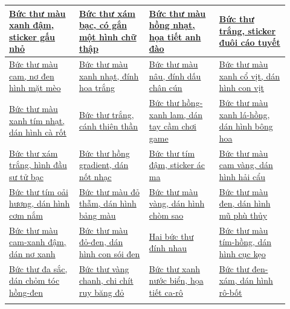 \documentclass[../main.tex]{subfiles}
\begin{document}
\begin{table}[H]
  \label{choice}
  \centering
  \begin{tabular}{|>{\centering\arraybackslash}p{0.23\linewidth}|>{\centering\arraybackslash}p{0.23\linewidth}|>{\centering\arraybackslash}p{0.23\linewidth}|>{\centering\arraybackslash}p{0.23\linewidth}|}\hline
    \hyperref[shino]{Bức thư màu xanh đậm, sticker gấu nhỏ}      & \hyperref[yae]{Bức thư xám bạc, có gắn một hình chữ thập}    & \hyperref[sakura]{Bức thư màu hồng nhạt, họa tiết anh đào}   & \hyperref[inari]{Bức thư trắng, sticker đuôi cáo tuyết}      \\\hline
    \hyperref[hanabi]{Bức thư màu cam, nơ đen hình mặt mèo}      & \hyperref[touka]{Bức thư màu xanh nhạt, đính hoa trắng}      & \hyperref[akane]{Bức thư màu nâu, đính dấu chân cún}         & \hyperref[kaoru]{Bức thư màu xanh cổ vịt, dán hình con vịt}  \\\hline
    \hyperref[uzuki]{Bức thư màu xanh tím nhạt, dán hình cà rốt} & \hyperref[kanade]{Bức thư trắng, cánh thiên thần}            & \hyperref[aku]{Bức thư hồng-xanh lam, dán tay cầm chơi game} & \hyperref[saki]{Bức thư màu xanh lá-hồng, dán hình bông hoa} \\\hline
    \hyperref[shiina]{Bức thư xám trắng, hình đầu sư tử bạc}     & \hyperref[azuki]{Bức thư hồng gradient, dán nốt nhạc}        & \hyperref[kana]{Bức thư tím đậm, sticker ác ma}              & \hyperref[suzune]{Bức thư màu cam vàng, dán hình hải cẩu}    \\\hline
    \hyperref[yuka]{Bức thư tím oải hương, dán hình cơm nắm}     & \hyperref[mari]{Bức thư màu đỏ thẫm, dán hình bảng màu}      & \hyperref[saya]{Bức thư màu vàng, dán hình chòm sao}         & \hyperref[shion]{Bức thư màu đen, dán hình mũ phù thủy}      \\\hline
    \hyperref[hotaru]{Bức thư màu cam-xanh đậm, dán nơ xanh}     & \hyperref[miku]{Bức thư màu đỏ-đen, dán hình con sói đen}    & \hyperref[ayawata]{Hai bức thư đính nhau}                    & \hyperref[mitsuki]{Bức thư màu tím-hồng, dán hình cục kẹo}   \\\hline
    \hyperref[honoka]{Bức thư đa sắc, dán chỏm tóc hồng-đen}     & \hyperref[koishin]{Bức thư vàng chanh, chi chít ruy băng đỏ} & \hyperref[nanase]{Bức thư xanh nước biển, họa tiết ca-rô}    & \hyperref[yuki]{Bức thư đen-xám, dán hình rô-bốt}            \\\hline
    \multicolumn{4}{|c|}{\hyperref[canon]{Không chọn một bức thư nào trong số này}}                                                                                                                                                                           \\ \hline
  \end{tabular}
\end{table}
\end{document}
